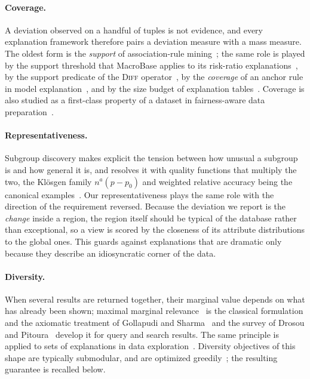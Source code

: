 \paragraph{Coverage.}
A deviation observed on a handful of tuples is not evidence, and every explanation
framework therefore pairs a deviation measure with a mass measure.
The oldest form is the \emph{support} of association-rule
mining~\cite{AgrawalIS93}; the same role is played by the support threshold that
MacroBase applies to its risk-ratio explanations~\cite{MacroBase}, by the support
predicate of the \textsc{Diff} operator~\cite{DIFF}, by the \emph{coverage} of an
anchor rule in model explanation~\cite{Anchors}, and by the size budget of
explanation tables~\cite{ExplanationTables}.
Coverage is also studied as a first-class property of a dataset in fairness-aware
data preparation~\cite{AsudehJJ19}.

\paragraph{Representativeness.}
Subgroup discovery makes explicit the tension between how unusual a subgroup is and
how general it is, and resolves it with quality functions that multiply the two,
the Klösgen family $n^{a}(p-p_0)$ and weighted relative accuracy being the canonical
examples~\cite{Wrobel97,HerreraCGJ11}.
Our representativeness plays the same role with the direction of the requirement
reversed.
Because the deviation we report is the \emph{change} inside a region, the
region itself should be typical of the database rather than exceptional, so a view
is scored by the closeness of its attribute distributions to the global ones.
This guards against explanations that are dramatic only because they describe an
idiosyncratic corner of the data.

\paragraph{Diversity.}
When several results are returned together, their marginal value depends on what has
already been shown; maximal marginal relevance~\cite{MMR} is the classical
formulation and the axiomatic treatment of Gollapudi and Sharma~\cite{GollapudiS09}
and the survey of Drosou and Pitoura~\cite{DrosouP10} develop it for query and
search results.
The same principle is applied to sets of explanations in data
exploration~\cite{FEDEX,ICDE23}.
Diversity objectives of this shape are typically submodular, and are optimized
greedily~\cite{LinBilmes11}; the resulting guarantee is recalled below.

